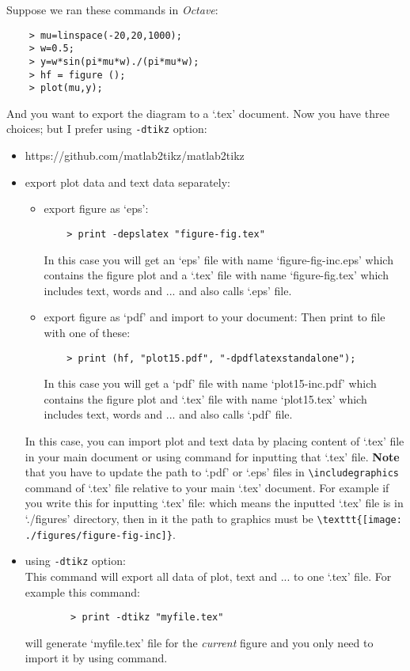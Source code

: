 \documentclass{article}
\begin{document}
    

Suppose we ran these commands in \textit{Octave}:
\begin{Verbatim}
    > mu=linspace(-20,20,1000);
    > w=0.5;
    > y=w*sin(pi*mu*w)./(pi*mu*w);
    > hf = figure ();
    > plot(mu,y);
\end{Verbatim}
And you want to export the diagram to a `.tex' document. Now you have three
choices; but I prefer using \texttt{-dtikz} option:
\begin{itemize}
\item https://github.com/matlab2tikz/matlab2tikz
\item export plot data and text data separately:
    \begin{itemize}
    \item export figure as `eps':
    \begin{Verbatim}
    > print -depslatex "figure-fig.tex"
    \end{Verbatim}
    In this case you will get an `eps' file with name
    `figure-fig-inc.eps' which contains the figure plot and a `.tex'
    file with name `figure-fig.tex' which includes text, words and
    ... and also calls `.eps' file.
    \item export figure as `pdf' and import to your document:
    Then print to file with one of these:
    \begin{Verbatim}
    > print (hf, "plot15.pdf", "-dpdflatexstandalone");
    \end{Verbatim}
    In this case you will get a `pdf' file with name `plot15-inc.pdf'
    which contains the figure plot and `.tex' file with name
    `plot15.tex' which includes text, words and ... and also calls
    `.pdf' file.
    \end{itemize} 
    In this case, you can import plot and text data by placing content of
    `.tex' file in your main document or using \verb"" command for
    inputting that `.tex' file. \textbf{Note} that you have to update the
    path to `.pdf' or `.eps' files in \verb"\includegraphics" command of
    `.tex' file relative to your main `.tex' document. For example if you
    write this for inputting `.tex' file:
    \verb"" which means the inputted
    `.tex' file is in `./figures' directory, then in it the path to graphics
    must be \verb"\texttt{[image: ./figures/figure-fig-inc]}".
\item using \texttt{-dtikz} option:\\
    This command will export all data of plot, text and ... to one `.tex'
    file. For example this command:
    \begin{Verbatim}
        > print -dtikz "myfile.tex"
    \end{Verbatim}
    will generate `myfile.tex' file for the \textit{current} figure and you only
    need to import it by using \verb"" command.
\end{itemize}
\end{document}

